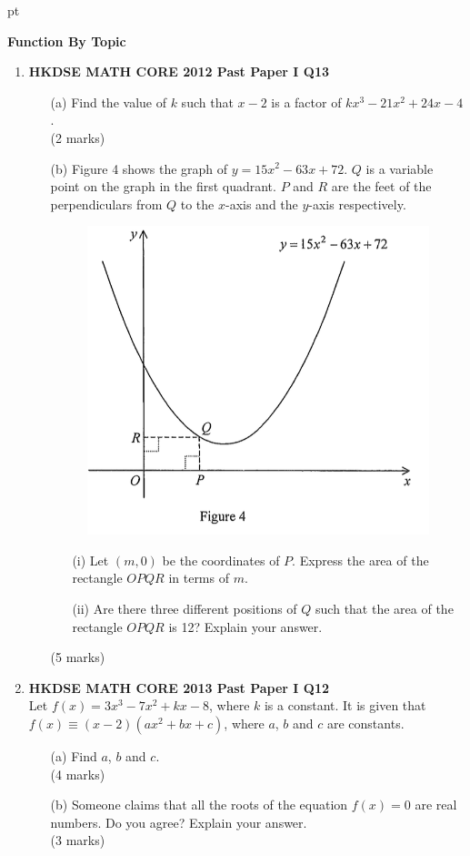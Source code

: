 \documentclass[12pt]{article}
\begin{document}
 pt
\begin{center}
	{\large \bf Function By Topic}
\end{center}
\vspace{0.05cm}

\begin{enumerate}
	\item \textbf{HKDSE MATH CORE 2012 Past Paper I Q13}
	\begin{enumerate}
		\item[(a)] Find the value of $k$ such that $x - 2$ is a factor of $kx^3 - 21x^2 + 24x - 4$. \\(2 marks)
		\item[(b)] Figure 4 shows the graph of $y = 15x^2 - 63x + 72$. $Q$ is a variable point on the graph in the first quadrant. $P$ and $R$ are the feet of the perpendiculars from $Q$ to the $x$-axis and the $y$-axis respectively.
		\begin{figure}[H]
			\centering
			\includegraphics[width = .3\linewidth]{2012Figure1.4}
		\end{figure}
		\begin{enumerate}
			\item[(i)] Let $(m, 0)$ be the coordinates of $P$. Express the area of the rectangle $OPQR$ in terms of $m$.
			\item[(ii)] Are there three different positions of $Q$ such that the area of the rectangle $OPQR$ is 12? Explain your answer.
		\end{enumerate}
		(5 marks)
	\end{enumerate}
	\newpage
	
	\item \textbf{HKDSE MATH CORE 2013 Past Paper I Q12}\\
	Let  $f(x) = 3x^3 - 7x^2 + kx - 8$, where $k$ is a constant. It is given that $f(x) \equiv (x - 2)(ax^2 + bx + c)$, where $a$, $b$ and $c$ are constants.
	\begin{enumerate}
		\item[(a)] Find $a$, $b$ and $c$. \\(4 marks)
		\item[(b)] Someone claims that all the roots of the equation  $f(x) = 0$ are real numbers. Do you agree? Explain your answer. \\(3 marks)
	\end{enumerate}
	\newpage


\end{enumerate}
\end{document}
